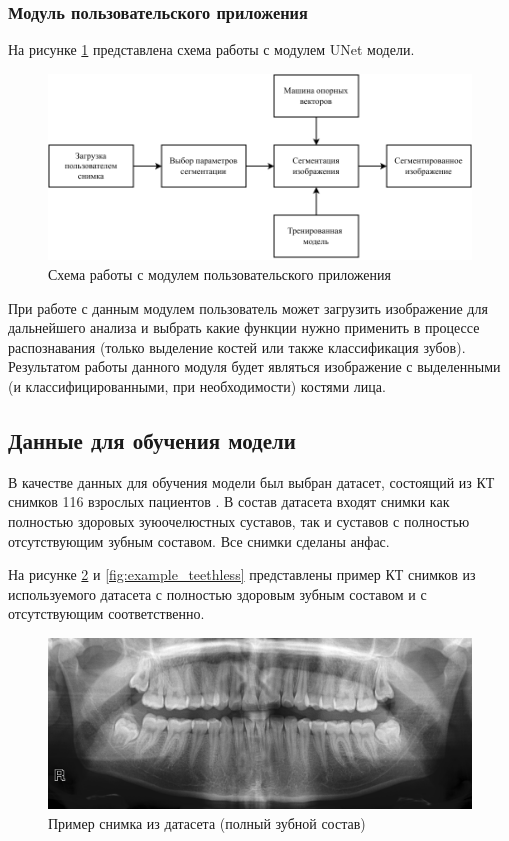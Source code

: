 \subsubsection{Модуль пользовательского приложения}

На рисунке \ref{fig:appuser} представлена схема работы с модулем UNet модели.

\begin{figure}[H]
	\centering
	\includegraphics[width=\textwidth]{img/appuser.pdf}
	\caption{Схема работы с модулем пользовательского приложения}
	\label{fig:appuser}
\end{figure}

При работе с данным модулем пользователь может загрузить изображение для дальнейшего анализа и выбрать какие функции нужно применить в процессе распознавания (только выделение костей или также классификация зубов). Результатом работы данного модуля будет являться изображение с выделенными (и классифицированными, при необходимости) костями лица.

\subsection{Данные для обучения модели}

В качестве данных для обучения модели был выбран датасет, состоящий из КТ снимков 116 взрослых пациентов \cite{dataset}. В состав датасета входят снимки как полностью здоровых зуюочелюстных суставов, так и суставов с полностью отсутствующим зубным составом. Все снимки сделаны анфас.

На рисунке \ref{fig:example} и \ref{fig:example_teethless} представлены пример КТ снимков из используемого датасета с полностью здоровым зубным составом и с отсутствующим соответственно.

\begin{figure}[H]
	\centering
	\includegraphics[width=\textwidth]{img/example.png}
	\caption{Пример снимка из датасета (полный зубной состав)}
	\label{fig:example}
\end{figure}

